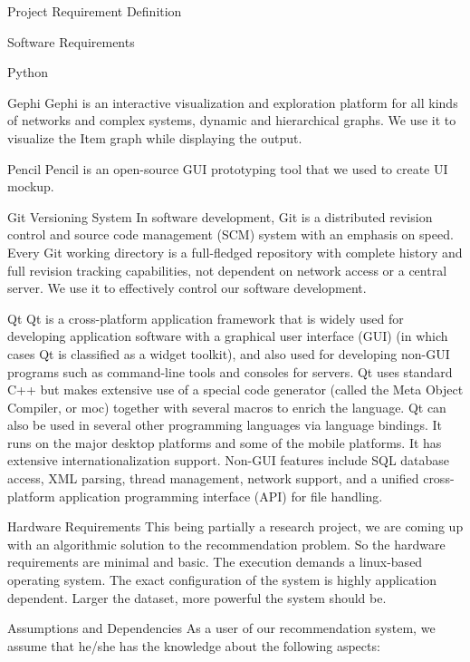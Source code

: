 \documentclass{report}
\begin{document}
\begin{projChapter}{Project Requirement Definition}
\begin{projSection}{Software Requirements}
\begin{projSubSection}{Python}
\end{projSubSection}
\begin{projSubSection}{Gephi}
Gephi is an interactive visualization and exploration platform for all kinds of networks  and complex systems, dynamic and hierarchical graphs. We use it to visualize the Item graph while displaying the output.
\end{projSubSection}
\begin{projSubSection}{Pencil}
Pencil is an open-source GUI prototyping tool that we used to create UI mockup.
\end{projSubSection}
\begin{projSubSection}{Git Versioning System}
In software development, Git is a distributed revision control and source code management (SCM) system with an emphasis on speed. Every Git working directory is a full-fledged repository with complete history and full revision tracking capabilities, not dependent on network access or a central server. We use it to effectively control our software development.
\end{projSubSection}
\begin{projSubSection}{Qt}
Qt is a cross-platform application framework that is widely used for developing application software with a graphical user interface (GUI) (in which cases Qt is classified as a widget toolkit), and also used for developing non-GUI programs such as command-line tools and consoles for servers. Qt uses standard C++ but makes extensive use of a special code generator (called the Meta Object Compiler, or moc) together with several macros to enrich the language. Qt can also be used in several other programming languages via language bindings. It runs on the major desktop platforms and some of the mobile platforms. It has extensive internationalization support. Non-GUI features include SQL database access, XML parsing, thread management, network support, and a unified cross-platform application programming  interface (API) for file handling.
\end{projSubSection}
\end{projSection}
\begin{projSection}{Hardware Requirements}
This being partially a research project, we are coming up with an algorithmic solution to the recommendation problem. So the hardware requirements are minimal and basic. The execution demands a linux-based operating system. The exact configuration of the system is highly application dependent. Larger the dataset, more powerful the system should be.
\end{projSection}
\begin{projSection}{Assumptions and Dependencies}
As a user of our recommendation system, we assume that he/she has the knowledge about the following aspects:


\end{projSection}
\end{projChapter}
\end{document}
